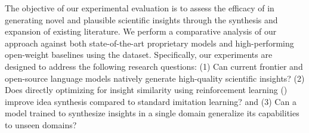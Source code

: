 
The objective of our experimental evaluation is to assess the efficacy of \ourmethod{} in generating novel and plausible scientific insights through the synthesis and expansion of existing literature. We perform a comparative analysis of our approach against both state-of-the-art proprietary models and high-performing open-weight baselines using the \ourbenchmark{} dataset. Specifically, our experiments are designed to address the following research questions:
(1) Can current frontier and open-source language models natively generate high-quality scientific insights? (2) Does directly optimizing for insight similarity using reinforcement learning (\ourmethod{}) improve idea synthesis compared to standard imitation learning? and (3) Can a model trained to synthesize insights in a single domain generalize its capabilities to unseen domains? 

